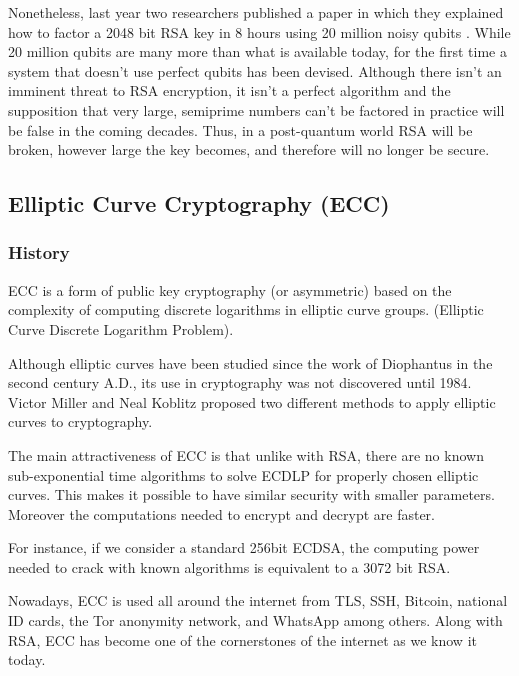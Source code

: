 Nonetheless, last year two researchers published a paper in which they
explained how to factor a 2048 bit RSA key in 8 hours using 20 million
noisy qubits \cite{gidney_how_2019}. While 20 million qubits are many
more than what is
available today, for the first time a system that doesn’t use perfect
qubits has been devised. Although there isn’t an imminent threat to RSA
encryption, it isn’t a perfect algorithm and the supposition that very
large, semiprime numbers can’t be factored in practice will be false in
the coming decades. Thus, in a post-quantum world RSA will be
broken, however large the key becomes, and therefore will no longer be
secure.



\pagebreak
\subsection{Elliptic Curve Cryptography (ECC)}

\subsubsection{History}

ECC is a form of public key cryptography (or asymmetric) based on the complexity
of computing discrete logarithms in elliptic curve groups. (Elliptic Curve
Discrete Logarithm Problem).

Although elliptic curves have been studied since the work of Diophantus in the
second century A.D., its use in cryptography was not discovered until 1984.
Victor Miller and Neal Koblitz proposed two different methods to apply elliptic
curves to cryptography. \cite{barsagade_overview_2014}

The main attractiveness of ECC is that unlike with RSA, there are no known
sub-exponential time algorithms to solve ECDLP for properly chosen elliptic
curves. This makes it possible to have similar security with smaller parameters.
Moreover the computations needed to encrypt and decrypt are faster.

For instance, if we consider a standard 256bit ECDSA, the computing power needed
to crack with known algorithms is equivalent to a 3072 bit RSA.
\cite{roetteler_quantum_2017}

Nowadays, ECC is used all around the internet from TLS, SSH, Bitcoin, national
ID cards, the Tor anonymity network, and WhatsApp among others. Along with RSA,
ECC has become one of the cornerstones of the internet as we know it today.

